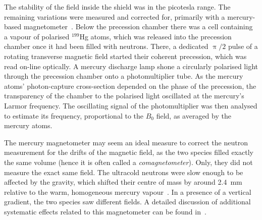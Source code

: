 The stability of the field inside the shield was in the picotesla range. The remaining variations were measured and corrected for, primarily with a mercury-based magnetometer~\cite{FertlThesis,Komposch2017}. Below the precession chamber there was a cell containing a vapour of polarised $^{199}$Hg atoms, which was released into the precession chamber once it had been filled with neutrons.
There, a dedicated $\uppi/2$ pulse of a rotating transverse magnetic field started their coherent precession, which was read on-line optically. A mercury discharge lamp shone a circularly polarised light through the precession chamber onto a photomultiplier tube. As the mercury atoms' photon-capture cross-section depended on the phase of the precession, the transparency of the chamber to the polarised light oscillated at the mercury's Larmor frequency. The oscillating signal of the photomultiplier was then analysed to estimate its frequency, proportional to the $B_0$ field, as averaged by the mercury atoms.

The mercury magnetometer may seem an ideal measure to correct the neutron measurement for the drifts of the magnetic field, as the two species filled exactly the same volume (hence it is often called a \emph{comagnetometer}). Only, they did not measure the exact same field. The ultracold neutrons were slow enough to be affected by the gravity, which shifted their centre of mass by around \SI{2.4}{\milli\meter} relative to the warm, homogeneous mercury vapour~\cite{Afach2014magmoment}. In a presence of a vertical gradient, the two species saw different fields. A detailed discussion of additional systematic effects related to this magnetometer can be found in~\cite{Afach2014magmoment}.

